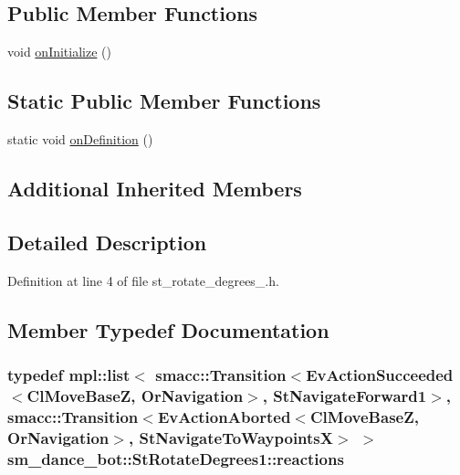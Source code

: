 \subsection*{Public Member Functions}
\begin{DoxyCompactItemize}
\item 
void \hyperlink{structsm__dance__bot_1_1StRotateDegrees1_a49fc454b780c8e8cb999569cbbfd52a4}{on\+Initialize} ()
\end{DoxyCompactItemize}
\subsection*{Static Public Member Functions}
\begin{DoxyCompactItemize}
\item 
static void \hyperlink{structsm__dance__bot_1_1StRotateDegrees1_a535acd0db1ac8c148f205e227682b6a5}{on\+Definition} ()
\end{DoxyCompactItemize}
\subsection*{Additional Inherited Members}


\subsection{Detailed Description}


Definition at line 4 of file st\+\_\+rotate\+\_\+degrees\+\_.\+h.



\subsection{Member Typedef Documentation}
\subsubsection[{\texorpdfstring{reactions}{reactions}}]{\setlength{\rightskip}{0pt plus 5cm}typedef mpl\+::list$<$ {\bf smacc\+::\+Transition}$<$Ev\+Action\+Succeeded$<${\bf Cl\+Move\+BaseZ}, {\bf Or\+Navigation}$>$, {\bf St\+Navigate\+Forward1}$>$, {\bf smacc\+::\+Transition}$<$Ev\+Action\+Aborted$<${\bf Cl\+Move\+BaseZ}, {\bf Or\+Navigation}$>$, {\bf St\+Navigate\+To\+WaypointsX}$>$ $>$ {\bf sm\+\_\+dance\+\_\+bot\+::\+St\+Rotate\+Degrees1\+::reactions}}\hypertarget{structsm__dance__bot_1_1StRotateDegrees1_aa7f3d798f5f408a14267e7c130a6a7e6}{}\label{structsm__dance__bot_1_1StRotateDegrees1_aa7f3d798f5f408a14267e7c130a6a7e6}


